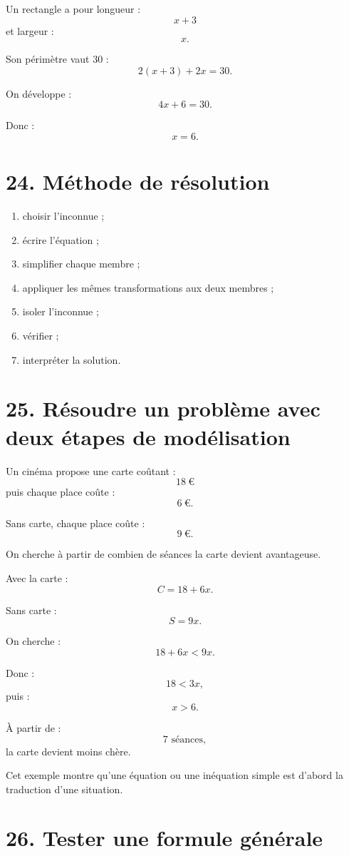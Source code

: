 Un rectangle a pour longueur :
\[
x+3
\]
et largeur :
\[
x.
\]

Son périmètre vaut $30$ :
\[
2(x+3)+2x=30.
\]

On développe :
\[
4x+6=30.
\]

Donc :
\[
x=6.
\]

\section{24. Méthode de résolution}

\begin{methode}
\begin{enumerate}
\item choisir l'inconnue ;
\item écrire l'équation ;
\item simplifier chaque membre ;
\item appliquer les mêmes transformations aux deux membres ;
\item isoler l'inconnue ;
\item vérifier ;
\item interpréter la solution.
\end{enumerate}
\end{methode}

\section{25. Résoudre un problème avec deux étapes de modélisation}

Un cinéma propose une carte coûtant :
\[
18\ \text{€}
\]
puis chaque place coûte :
\[
6\ \text{€}.
\]

Sans carte, chaque place coûte :
\[
9\ \text{€}.
\]

On cherche à partir de combien de séances la carte devient avantageuse.

Avec la carte :
\[
C=18+6x.
\]

Sans carte :
\[
S=9x.
\]

On cherche :
\[
18+6x<9x.
\]

Donc :
\[
18<3x,
\]
puis :
\[
x>6.
\]

À partir de :
\[
\boxed{7\text{ séances}},
\]
la carte devient moins chère.

Cet exemple montre qu'une équation ou une inéquation simple est d'abord la traduction d'une situation.

\section{26. Tester une formule générale}

